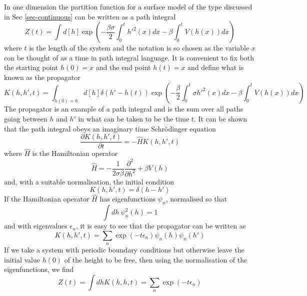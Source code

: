 In one dimension the partition function for a surface model of the type discussed in Sec \ref{sec-continuous} can be written as a path integral 
\begin{equation}
Z(t)  = \int d[h]\exp\left(-\frac{\beta\sigma}{2}\int_0^t h'^2(x) dx -\beta\int_0^t  V(h(x)) dx\right)
\end{equation}
where $t$ is the length of the system and the notation is so chosen as the variable $x$ con be thought of as a time in path integral language.
It is convenient to fix both the starting point $h(0)=x$ and the end point $h(t)=x$ and define what is known as the propagator \cite{matsubara_new_1955}
\begin{equation}
K(h,h',t)=\int_{h(0)=h} d[h] \delta(h' -h(t)) \exp\left(-\frac{\beta}{2}\int_0^t \sigma h'^2(x) dx -\beta \int_0^t  V(h(x)) dx\right)\label{prog}
\end{equation}
The propagator is an example of a path integral and is the sum over all paths going between 
$h$ and $h'$ in what can be taken to be the time $t$.  It can be shown \cite{h_kleinert_path_2009} that the path integral obeys an imaginary time Schr\"odinger equation
\begin{equation}
\frac{\partial  K(h,h',t)}{\partial t} = -\hat H K(h,h',t)
\end{equation}
where $\hat H$ is the Hamiltonian operator
\begin{equation}
\hat H = -\frac{1}{2\sigma\beta}\frac{\partial^2 }{\partial h^2} + \beta V(h)
\end{equation}
and, with a suitable normalisation, the initial condition
\begin{equation}
K(h,h',t)=\delta(h-h')
\end{equation}
If the Hamiltonian operator $\hat H$ has eigenfunctions $\psi_n$, normalised so that
\begin{equation}
\int dh \ \psi^2_n(h) = 1
\end{equation}
 and with eigenvalues $\epsilon_n$, it is easy to see that the propagator can be written as
\begin{equation}
K(h,h',t)= \sum_n \exp(-t\epsilon_n)\psi_n(h)\psi_n(h')
\end{equation}
If we take a system with periodic boundary conditions but otherwise leave the initial value $h(0)$ of the height to be free, then using the normalisation of the eigenfunctions, we find
\begin{equation}
Z(t) = \int dh K(h,h,t) = \sum_n \exp(-t\epsilon_n)
\end{equation}

